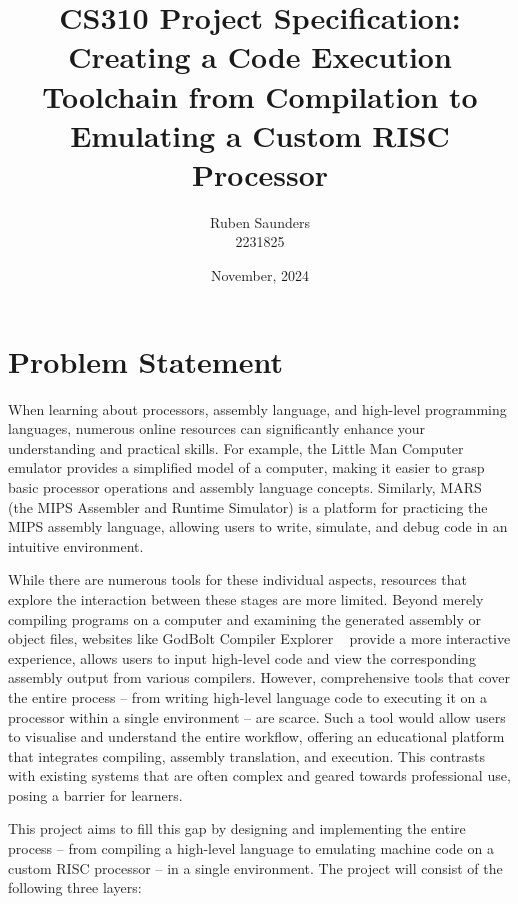 \documentclass{article}
\begin{document}
    \title{CS310 Project Specification:\\Creating a Code Execution Toolchain from Compilation to Emulating a Custom RISC Processor}
    \author{Ruben Saunders\\2231825}
    \date{November, 2024}

    \maketitle

    \section{Problem Statement}\label{sec:problem-statement}

    When learning about processors, assembly language, and high-level programming languages, numerous online resources can significantly enhance your understanding and practical skills.
    For example, the Little Man Computer ~\cite{lmc} emulator provides a simplified model of a computer, making it easier to grasp basic processor operations and assembly language concepts.
    Similarly, MARS ~\cite{mars-simulator} (the MIPS Assembler and Runtime Simulator) is a platform for practicing the MIPS assembly language, allowing users to write, simulate, and debug code in an intuitive environment.

    While there are numerous tools for these individual aspects, resources that explore the interaction between these stages are more limited.
    Beyond merely compiling programs on a computer and examining the generated assembly or object files, websites like GodBolt Compiler Explorer ~\cite{godbolt} provide a more interactive experience, allows users to input high-level code and view the corresponding assembly output from various compilers.
    However, comprehensive tools that cover the entire process -- from writing high-level language code to executing it on a processor within a single environment -- are scarce.
    Such a tool would allow users to visualise and understand the entire workflow, offering an educational platform that integrates compiling, assembly translation, and execution.
    This contrasts with existing systems that are often complex and geared towards professional use, posing a barrier for learners.

    This project aims to fill this gap by designing and implementing the entire process -- from compiling a high-level language to emulating machine code on a custom RISC processor -- in a single environment.
    The project will consist of the following three layers:
\end{document}
